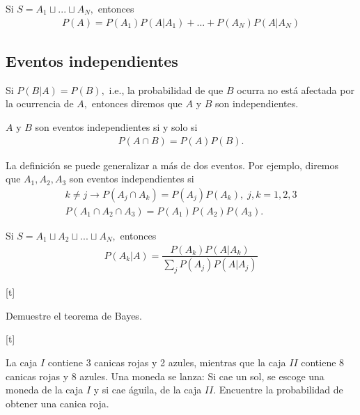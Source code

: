{}
\begin{thm}
 \label{thm:1.10} Si $S=A_{1}\sqcup ... \sqcup A_{N},$  entonces
 \begin{align}
\label{1.20}
P(A)=P(A_{1})P(A|A_{1})+...+P(A_{N})P(A|A_{N})
\end{align}
\end{thm}


\subsection{Eventos independientes}
{}
Si $P(B|A)=P(B),$ i.e., la probabilidad de que $B$ ocurra no está afectada por la ocurrencia de $A,$ entonces diremos que $A$ y $B$ son independientes.


\begin{defn}
 $A$ y $B$ son eventos independientes si y solo si
 \begin{align}
  \label{1.21}
  P(A \cap B) = P(A)P(B).
 \end{align}
\end{defn}


{}
La definición se puede generalizar a más de dos eventos.  Por ejemplo, diremos que $A_{1},A_{2},A_{3}$ son eventos independientes si
\begin{align}
k\neq j \rightarrow P(A_{j} \cap A_{k})=P(A_{j})P(A_{k}), \; j,k=1,2,3 
\\ P(A_{1}\cap A_{2} \cap A_{3})=P(A_{1})P(A_{2})P(A_{3}).
\end{align}


{}
\begin{thm}
 Si $S=A_{1}\sqcup A_{2} \sqcup...\sqcup A_{N},$ entonces
 \begin{align}
  \label{1.24}
  P(A_{k}|A) = \dfrac{P(A_{k})P(A|A_{k})}{\sum_{j} P(A_{j})P(A|A_{j})}
 \end{align}

\end{thm}



[t]
 \begin{ejemplo}
  \label{solved:1.16}
  Demuestre el teorema de Bayes.
 \end{ejemplo}



[t]{}
 \begin{ejemplo}
  \label{solved:1.15}
 La caja $I$ contiene 3 canicas rojas y 2 azules, mientras que la caja $II$ contiene $8$ canicas rojas y 8 azules. Una moneda se lanza: Si cae un sol, se escoge una moneda de la caja $I$ y si cae águila, de la caja $II.$ Encuentre la probabilidad de obtener una canica roja.
 \end{ejemplo}


